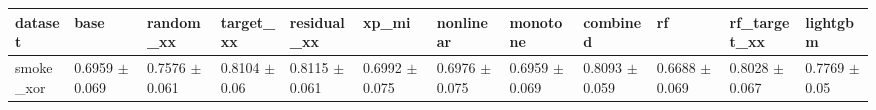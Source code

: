 \begin{tabular}{llllllllllll}
\toprule
dataset & base & random\_xx & target\_xx & residual\_xx & xp\_mi & nonlinear & monotone & combined & rf & rf\_target\_xx & lightgbm \\
\midrule
smoke\_xor & 0.6959 $\pm$ 0.069 & 0.7576 $\pm$ 0.061 & 0.8104 $\pm$ 0.06 & 0.8115 $\pm$ 0.061 & 0.6992 $\pm$ 0.075 & 0.6976 $\pm$ 0.075 & 0.6959 $\pm$ 0.069 & 0.8093 $\pm$ 0.059 & 0.6688 $\pm$ 0.069 & 0.8028 $\pm$ 0.067 & 0.7769 $\pm$ 0.05 \\
\bottomrule
\end{tabular}
